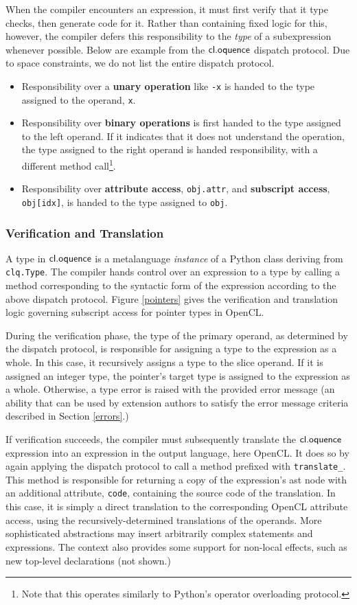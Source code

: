 \documentclass{llncs}
\begin{document}
When the compiler encounters an expression, it must first verify that it type checks, then generate code for it. Rather than containing fixed logic for this, however, the compiler defers this responsibility to the {\it type} of a subexpression whenever possible. Below are example from the $\textsf{cl.oquence}$ dispatch protocol. Due to space constraints, we do not list the entire dispatch protocol.
\begin{itemize}
\item Responsibility over a {\bf unary operation} like \verb|-x| is handed to the type assigned to the operand, \verb|x|.
\item Responsibility over {\bf binary operations} is first handed to the type assigned to the left operand. If it indicates that it does not understand the operation, the type assigned to the right operand is handed responsibility, with a different method call\footnote{Note that this operates similarly to Python's operator overloading protocol.}.
\item Responsibility over {\bf attribute access}, \texttt{obj.attr}, and {\bf subscript access}, \texttt{obj[idx]}, is handed to the type assigned to \texttt{obj}.
\end{itemize}

\subsubsection{Verification and Translation}
A type in $\textsf{cl.oquence}$ is a metalanguage {\it instance} of a Python class deriving from \verb|clq.Type|. The compiler hands control over an expression to a type by calling a method corresponding to the syntactic form of the expression according to the above dispatch protocol. Figure \ref{pointers} gives the verification and translation logic governing subscript access for pointer types in OpenCL.

During the verification phase, the type of the primary operand, as determined by the dispatch protocol, is responsible for assigning a type to the expression as a whole. In this case, it recursively assigns a type to the slice operand. If it is assigned an integer type, the pointer's target type is assigned to the expression as a whole. Otherwise, a type error is raised with the provided error message (an ability that can be used by extension authors to satisfy the error message criteria described in Section \ref{errors}.) 

If verification succeeds, the compiler must subsequently translate the $\textsf{cl.oquence}$ expression into an expression in the output language, here OpenCL. It does so by again applying the dispatch protocol to call a method prefixed with \verb|translate_|. This method is responsible for returning a copy of the expression's ast node with an additional attribute, \verb|code|, containing the source code of the translation. In this case, it is simply a direct translation to the corresponding OpenCL attribute access, using the recursively-determined translations of the operands. More sophisticated abstractions may insert arbitrarily complex statements and expressions. The context also provides some support for non-local effects, such as new top-level declarations (not shown.)
\end{document}
